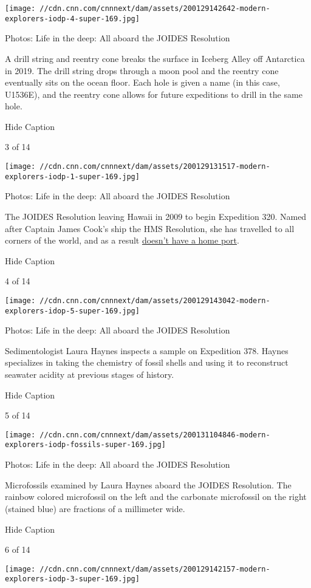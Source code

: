 \texttt{[image: //cdn.cnn.com/cnnnext/dam/assets/200129142642-modern-explorers-iodp-4-super-169.jpg]}

Photos: Life in the deep: All aboard the JOIDES Resolution

A drill string and reentry cone breaks the surface in Iceberg Alley off
Antarctica in 2019. The drill string drops through a moon pool and the
reentry cone eventually sits on the ocean floor. Each hole is given a
name (in this case, U1536E), and the reentry cone allows for future
expeditions to drill in the same hole.

Hide Caption

3 of 14

\texttt{[image: //cdn.cnn.com/cnnnext/dam/assets/200129131517-modern-explorers-iodp-1-super-169.jpg]}

Photos: Life in the deep: All aboard the JOIDES Resolution

The JOIDES Resolution leaving Hawaii in 2009 to begin Expedition 320.
Named after Captain James Cook's ship the HMS Resolution, she has
travelled to all corners of the world, and as a result
\href{https://joidesresolution.org/frequently-asked-questions/}{doesn't
have a home port}.

Hide Caption

4 of 14

\texttt{[image: //cdn.cnn.com/cnnnext/dam/assets/200129143042-modern-explorers-idop-5-super-169.jpg]}

Photos: Life in the deep: All aboard the JOIDES Resolution

Sedimentologist Laura Haynes inspects a sample on Expedition 378. Haynes
specializes in taking the chemistry of fossil shells and using it to
reconstruct seawater acidity at previous stages of history.

Hide Caption

5 of 14

\texttt{[image: //cdn.cnn.com/cnnnext/dam/assets/200131104846-modern-explorers-iodp-fossils-super-169.jpg]}

Photos: Life in the deep: All aboard the JOIDES Resolution

Microfossils examined by Laura Haynes aboard the JOIDES Resolution. The
rainbow colored microfossil on the left and the carbonate microfossil on
the right (stained blue) are fractions of a millimeter wide.

Hide Caption

6 of 14

\texttt{[image: //cdn.cnn.com/cnnnext/dam/assets/200129142157-modern-explorers-iodp-3-super-169.jpg]}

